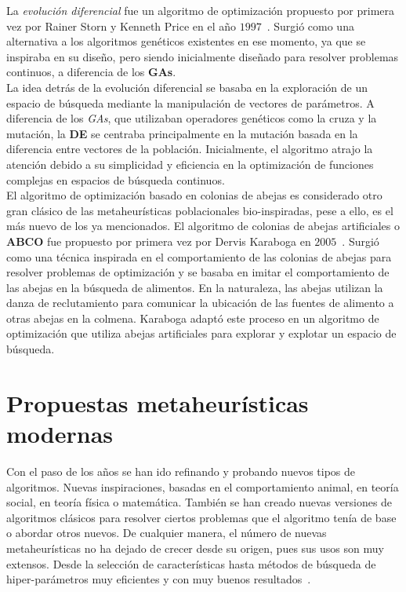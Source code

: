 La \textit{evolución diferencial} fue un algoritmo de optimización propuesto por primera vez por Rainer Storn y Kenneth Price en el año $1997$~\cite{storn_differential_1997}. Surgió como una alternativa a los algoritmos genéticos existentes en ese momento, ya que se inspiraba en su diseño, pero siendo inicialmente diseñado para resolver problemas continuos, a diferencia de los \textbf{GAs}.\\[6pt]
La idea detrás de la evolución diferencial se basaba en la exploración de un espacio de búsqueda mediante la manipulación de vectores de parámetros. A diferencia de los \textit{GAs}, que utilizaban operadores genéticos como la cruza y la mutación, la \textbf{DE} se centraba principalmente en la mutación basada en la diferencia entre vectores de la población. Inicialmente, el algoritmo atrajo la atención debido a su simplicidad y eficiencia en la optimización de funciones complejas en espacios de búsqueda continuos.\\[6pt]
El algoritmo de optimización basado en colonias de abejas es considerado otro gran clásico de las metaheurísticas poblacionales bio-inspiradas, pese a ello, es el más nuevo de los ya mencionados. El algoritmo de colonias de abejas artificiales o \textbf{ABCO} fue propuesto por primera vez por Dervis Karaboga en $2005$~\cite{karaboga_idea_nodate}. Surgió como una técnica inspirada en el comportamiento de las colonias de abejas para resolver problemas de optimización y se basaba en imitar el comportamiento de las abejas en la búsqueda de alimentos. En la naturaleza, las abejas utilizan la danza de reclutamiento para comunicar la ubicación de las fuentes de alimento a otras abejas en la colmena. Karaboga adaptó este proceso en un algoritmo de optimización que utiliza abejas artificiales para explorar y explotar un espacio de búsqueda.

\section{Propuestas metaheurísticas modernas}
Con el paso de los años se han ido refinando y probando nuevos tipos de algoritmos. Nuevas inspiraciones, basadas en el comportamiento animal, en teoría social, en teoría física o matemática. También se han creado nuevas versiones de algoritmos clásicos para resolver ciertos problemas que el algoritmo tenía de base o abordar otros nuevos. De cualquier manera, el número de nuevas metaheurísticas no ha dejado de crecer desde su origen, pues sus usos son muy extensos. Desde la selección de características hasta métodos de búsqueda de hiper-parámetros muy eficientes y con muy buenos resultados~\cite{jaderberg2017population}.

